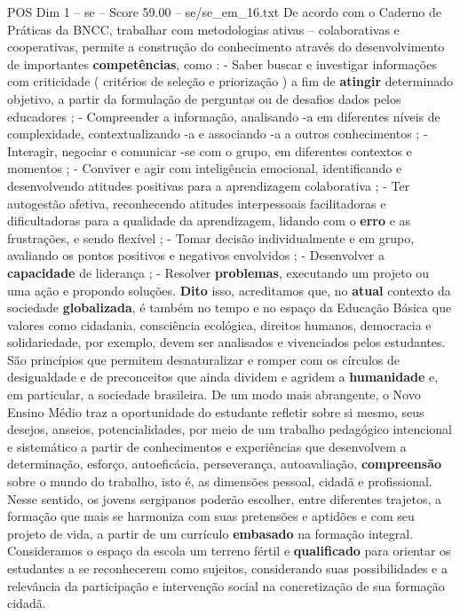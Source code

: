 \begin{textsample}{POS Dim 1 – se – Score 59.00 – se/se\_em\_16.txt}
De acordo com o Caderno de Práticas da BNCC, trabalhar com metodologias ativas – colaborativas e cooperativas, permite a construção do conhecimento através do desenvolvimento de importantes \textbf{competências}, como : - Saber buscar e investigar informações com criticidade ( critérios de seleção e priorização ) a fim de \textbf{atingir} determinado objetivo, a partir da formulação de perguntas ou de desafios dados pelos educadores ; - Compreender a informação, analisando -a em diferentes níveis de complexidade, contextualizando -a e associando -a a outros conhecimentos ; - Interagir, negociar e comunicar -se com o grupo, em diferentes contextos e momentos ; - Conviver e agir com inteligência emocional, identificando e desenvolvendo atitudes positivas para a aprendizagem colaborativa ; - Ter autogestão afetiva, reconhecendo atitudes interpessoais facilitadoras e dificultadoras para a qualidade da aprendizagem, lidando com o \textbf{erro} e as frustrações, e sendo flexível ; - Tomar decisão individualmente e em grupo, avaliando os pontos positivos e negativos envolvidos ; - Desenvolver a \textbf{capacidade} de liderança ; - Resolver \textbf{problemas}, executando um projeto ou uma ação e propondo soluções. \textbf{Dito} isso, acreditamos que, no \textbf{atual} contexto da sociedade \textbf{globalizada}, é também no tempo e no espaço da Educação Básica que valores como cidadania, consciência ecológica, direitos humanos, democracia e solidariedade, por exemplo, devem ser analisados e vivenciados pelos estudantes.
São princípios que permitem desnaturalizar e romper com os círculos de desigualdade e de preconceitos que ainda dividem e agridem a \textbf{humanidade} e, em particular, a sociedade brasileira.
De um modo mais abrangente, o Novo Ensino Médio traz a oportunidade do estudante refletir sobre si mesmo, seus desejos, anseios, potencialidades, por meio de um trabalho pedagógico intencional e sistemático a partir de conhecimentos e experiências que desenvolvem a determinação, esforço, autoeficácia, perseverança, autoavaliação, \textbf{compreensão} sobre o mundo do trabalho, isto é, as dimensões pessoal, cidadã e profissional.
Nesse sentido, os jovens sergipanos poderão escolher, entre diferentes trajetos, a formação que mais se harmoniza com suas pretensões e aptidões e com seu projeto de vida, a partir de um currículo \textbf{embasado} na formação integral.
Consideramos o espaço da escola um terreno fértil e \textbf{qualificado} para orientar os estudantes a se reconhecerem como sujeitos, considerando suas possibilidades e a relevância da participação e intervenção social na concretização de sua formação cidadã.

\end{textsample}

